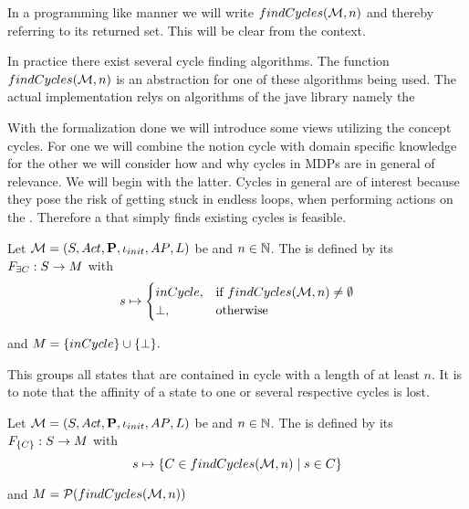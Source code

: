 \documentclass[preview]{standalone}
\begin{document}
In a programming like manner we will write ${findCycles}({{{\mathcal{M}}}},n)$ and thereby referring to its returned set. This will be clear from the context.

In practice there exist several cycle finding algorithms. The function ${findCycles}({{{\mathcal{M}}}}, n)$ is an abstraction for one of these algorithms being used. The actual implementation relys on algorithms of the jave library \jgrapht namely the 

With the formalization done we will introduce some views utilizing the concept cycles. For one we will combine the notion cycle with domain specific knowledge for the other we will consider how and why cycles in MDPs are in general of relevance. We will begin with the latter.  Cycles in general are of interest because they pose the risk of getting stuck in endless loops, when performing actions on the \mdpN.  Therefore a \viewN that simply finds existing cycles is feasible.


\begin{definition}
	Let ${{{\mathcal{M}}}} = {{({S}, {Act}, {\textbf{P}}, {\iota_{init}}, {AP}, {L})}}$ be \achgphN and $n \in {\mathbb{N}}$. The \viewN \viewhascycle is defined by its \grpfctN ${{F_{\exists{C}}}} : {S} \to {\ensuremath{{M}}}$ with
	\[
	{s} \mapsto
	\begin{cases}
		inCycle, &\text{if } {findCycles}({{{\mathcal{M}}}}, n) \neq \emptyset \\
		{\bot}, &\text{otherwise}
	\end{cases}
	\]
	
	and ${{M}} = \{inCycle\} \cup {\{\bot\}}.$
\end{definition}

This \viewN groups all states that are contained in cycle with a length of at least $n$. It is to note that the affinity of a state to one or several respective cycles is lost.


\begin{definition}
	Let ${{{\mathcal{M}}}} = {{({S}, {Act}, {\textbf{P}}, {\iota_{init}}, {AP}, {L})}}$ be \achgphN and $n \in {\mathbb{N}}$. The \viewN \viewexactcycle is defined by its \grpfctN ${{F_{\{{C}\}}}} : {S} \to {\ensuremath{{M}}}$ with
	\[
	{s} \mapsto \{{C} \in {findCycles}({{{\mathcal{M}}}}, n) \mid {s} \in {C}\}
	\]
	
	and ${{M}} = {\mathcal{P}({findCycles}({{{\mathcal{M}}}}, n))}$
	\label{def:exactcycleview}
\end{definition}
\end{document}
